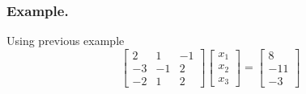 \documentclass[../../../main.tex]{subfiles}
\begin{document}
\subsubsection{Example.} Using previous example
\begin{equation*}
    \begin{bmatrix}
        2  & 1  & -1 \\
        -3 & -1 & 2  \\
        -2 & 1  & 2
    \end{bmatrix}
    \begin{bmatrix}
        x_1 \\ x_2 \\ x_3
    \end{bmatrix}
    =
    \begin{bmatrix}
        8 \\ -11 \\ -3
    \end{bmatrix}
\end{equation*}
\end{document}
